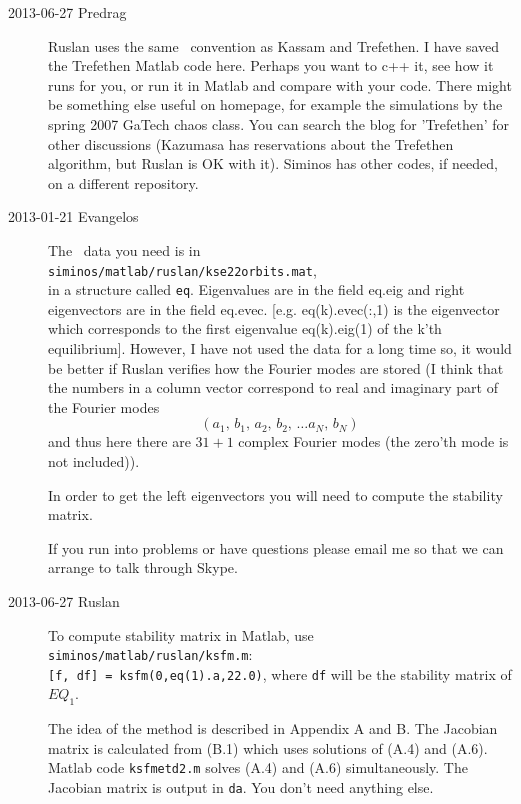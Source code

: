 \begin{description}
\item[2013-06-27 Predrag]
Ruslan uses the same \KSe\ convention as Kassam and
Trefethen. I have saved the Trefethen Matlab code
 {here}. Perhaps
you want to c++ it, see how it runs for you, or run it in Matlab and
compare with your code. There might be something else useful on
 homepage,
for example the simulations by the spring 2007 GaTech chaos class.
You can search the blog for 'Trefethen' for other discussions
(Kazumasa has reservations about the Trefethen algorithm,
but Ruslan is OK with it).
Siminos has other codes, if needed, on a different repository.

\item[2013-01-21 Evangelos] The \KS\ data you need is in \\
\texttt{siminos/matlab/ruslan/kse22orbits.mat},
\\
in a structure called \texttt{eq}.
Eigenvalues are in the field eq.eig and right
eigenvectors are in the field eq.evec. [e.g. eq(k).evec(:,1) is the
eigenvector which corresponds to the first eigenvalue eq(k).eig(1) of
the k'th equilibrium]. However, I have not used the data for a long
time so, it would be better if Ruslan verifies how the Fourier modes
are stored (I think that the numbers in a column vector correspond to
real and imaginary part of the Fourier modes
\[
 (a_1,\, b_1,\, a_2,\, b_2,\, \ldots a_N,\, b_N)
\]
and thus here there are $31+1$ complex Fourier modes (the zero'th mode
is not included)).

In order to get the left eigenvectors you will need to compute the
stability matrix.

If you run into problems or have questions please email me so that we
can arrange to talk through Skype.


\item[2013-06-27 Ruslan] To compute stability matrix in Matlab, use
\\
\texttt{siminos/matlab/ruslan/ksfm.m}:
\\ {\tt [f, df] = ksfm(0,eq(1).a,22.0)},
where {\tt df} will be the stability matrix of $EQ_1$.

The idea of the method is described in  Appendix A and
B.  The Jacobian matrix is calculated from (B.1) which uses solutions
of (A.4) and (A.6).  Matlab code {\tt ksfmetd2.m} solves (A.4) and
(A.6) simultaneously.  The Jacobian matrix is output in {\tt da}.
You don't need anything else.


\end{description}
